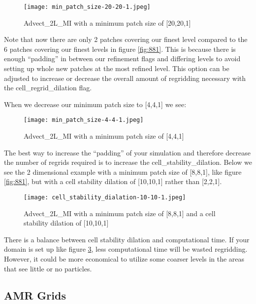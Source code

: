 \begin{figure}[H]
  \centering
  \texttt{[image: min\_patch\_size-20-20-1.jpeg]}
  \caption{Advect\_2L\_MI with a minimum patch size of [20,20,1]}
  \label{}
\end{figure}

Note that now there are only 2 patches covering our finest level compared to the 6 patches covering our finest levels in figure \ref{fig:881}. This is because there is enough ``padding'' in between our refinement flags and differing levels to avoid setting up whole new patches at the most refined level. This option can be adjusted to increase or decrease the overall amount of regridding necessary with the cell\_regrid\_dilation flag. 

When we decrease our minimum patch size to [4,4,1] we see:
\begin{figure}[H]
  \centering
  \texttt{[image: min\_patch\_size-4-4-1.jpeg]}
  \caption{Advect\_2L\_MI with a minimum patch size of [4,4,1]}
  \label{fig:441}
\end{figure}

The best way to increase the ``padding'' of your simulation and therefore decrease the number of regrids required is to increase the cell\_stability\_dilation. Below we see the 2 dimensional example with a minimum patch size of [8,8,1], like figure \ref{fig:881}, but with a cell stability dilation of [10,10,1] rather than [2,2,1].

\begin{figure}[H]
  \centering
  \texttt{[image: cell\_stability\_dialation-10-10-1.jpeg]}
  \caption{Advect\_2L\_MI with a minimum patch size of [8,8,1] and a cell stability dilation of [10,10,1]}
  \label{fig:10101}
\end{figure}

There is a balance between cell stability dilation and computational time. If your domain is set up like figure \ref{fig:10101}, less computational time will be wasted regridding. However, it could be more economical to utilize some coarser levels in the areas that see little or no particles.


\subsection{AMR Grids}


